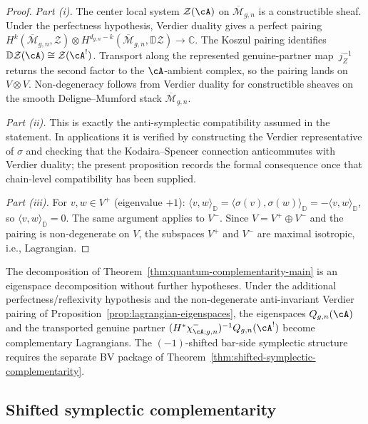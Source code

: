\begin{proof}
\emph{Part (i).}
The center local system $\mathcal{Z}(\cA)$ on
$\overline{\mathcal{M}}_{g,n}$ is a constructible sheaf. Under the
perfectness hypothesis, Verdier duality gives a perfect pairing
$H^k(\overline{\mathcal{M}}_{g,n}, \mathcal{Z}) \otimes
H^{d_{g,n}-k}(\overline{\mathcal{M}}_{g,n}, \mathbb{D}\mathcal{Z})
\to \mathbb{C}$.
The Koszul pairing identifies $\mathbb{D}\mathcal{Z}(\cA) \cong
\mathcal{Z}(\cA^!)$. Transport along the represented
genuine-partner map~$j_Z^{-1}$ returns the second factor to the
$\cA$-ambient complex, so the pairing lands on $V \otimes V$.
Non-degeneracy follows from Verdier
duality for constructible sheaves on the smooth Deligne--Mumford
stack $\overline{\mathcal{M}}_{g,n}$.

\emph{Part (ii).}
This is exactly the anti-symplectic compatibility assumed in the
statement. In applications it is verified by constructing the
Verdier representative of $\sigma$ and checking that the
Kodaira--Spencer connection anticommutes with Verdier duality; the
present proposition records the formal consequence once that
chain-level compatibility has been supplied.

\emph{Part (iii).}
For $v, w \in V^+$ (eigenvalue $+1$):
$\langle v, w \rangle_{\mathbb{D}}
= \langle \sigma(v), \sigma(w) \rangle_{\mathbb{D}}
= -\langle v, w \rangle_{\mathbb{D}}$,
so $\langle v, w \rangle_{\mathbb{D}} = 0$. The same argument
applies to $V^-$. Since $V = V^+ \oplus V^-$ and the pairing is
non-degenerate on $V$, the subspaces $V^+$ and $V^-$ are maximal
isotropic, i.e., Lagrangian.
\end{proof}

\begin{remark}\label{rem:lagrangian-complementarity}
The decomposition of
Theorem~\ref{thm:quantum-complementarity-main} is an eigenspace
decomposition without further hypotheses. Under the additional
perfectness/reflexivity hypothesis and the non-degenerate
anti-invariant Verdier pairing of
Proposition~\ref{prop:lagrangian-eigenspaces}, the eigenspaces
$Q_{g,n}(\cA)$ and the transported genuine partner
$(H^*\chi^-_{\cA;g,n})^{-1}Q_{g,n}(\cA^!)$ become complementary
Lagrangians.
The $(-1)$-shifted bar-side symplectic structure requires the
separate BV package of
Theorem~\ref{thm:shifted-symplectic-complementarity}.
\end{remark}

\subsection{Shifted symplectic complementarity}
\label{sec:shifted-symplectic-complementarity}

